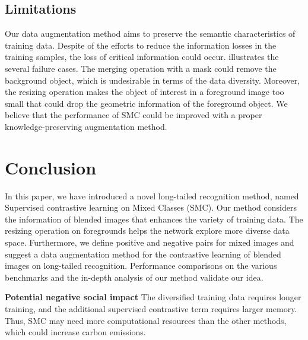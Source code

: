 \documentclass[10pt,twocolumn,letterpaper]{article}
\begin{document}
\subsection{Limitations}
Our data augmentation method aims to preserve the semantic characteristics of training data.
Despite of the efforts to reduce the information losses in the training samples, the loss of critical information could occur.
 illustrates the several failure cases.
The merging operation with a mask could remove the background object, which is undesirable in terms of the data diversity. Moreover, the resizing operation makes the object of interest in a foreground image too small that could drop the geometric information of the foreground object.
We believe that the performance of SMC could be improved with a proper knowledge-preserving augmentation method.




\section{Conclusion}
In this paper, we have introduced a novel long-tailed recognition method, named Supervised contrastive learning on Mixed Classes (SMC). Our method considers the information of blended images that enhances the variety of training data. The resizing operation on foregrounds helps the network explore more diverse data space. Furthermore, we define positive and negative pairs for mixed images and suggest a data augmentation method for the contrastive learning of blended images on long-tailed recognition. Performance comparisons on the various benchmarks and the in-depth analysis of our method validate our idea.

\textbf{Potential negative social impact}
The diversified training data requires longer training, and the additional supervised contrastive term requires larger memory. Thus, SMC may need more computational resources than the other methods, which could increase carbon emissions.


{\small


}
\end{document}
